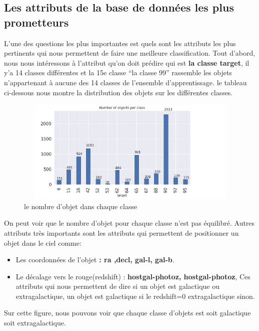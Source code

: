 \newline
\subsection{Les attributs de la base de données les plus prometteurs}
L’une des questions les plus importantes est quels sont les attributs les plus pertinents qui nous permettent de faire une meilleure classification. Tout d’abord, nous nous intéressons à l’attribut qu’on doit prédire qui est \textbf{la classe target}, il y’a 14 classes différentes et la 15e classe “la classe 99” rassemble les objets n’appartenant à aucune des 14 classes de l’ensemble d’apprentissage.
\newpage
le tableau ci-dessous nous montre la distribution des objets sur les différentes classes.
\begin{figure}[!h]
    \centering
    \includegraphics[width=15cm,height=5cm]{report/figures/objet-class.jpg}
    \caption{le nombre d'objet dans chaque classe}
    \label{fig:my_label}
\end{figure}
\newline
On peut voir que le nombre d'objet pour chaque classe n'est pas équilibré.
\newline
\newline
Autres attributs très importants sont les attributs qui permettent de positionner un objet dans le ciel comme:
\begin{itemize}
    \item Les coordonnées de l’objet \textbf{: ra ,decl, gal-l, gal-b}.
    \item Le décalage vers le rouge(redshift) :\textbf{ hostgal-photoz, hostgal-photoz}, Ces attributs qui nous permettent de dire si un objet est galactique ou extragalactique, un objet est galactique si le redshift=0 extragalactique sinon.
\end{itemize}

Sur cette figure, nous pouvons voir que chaque classe d'objets est soit galactique soit extragalactique.

